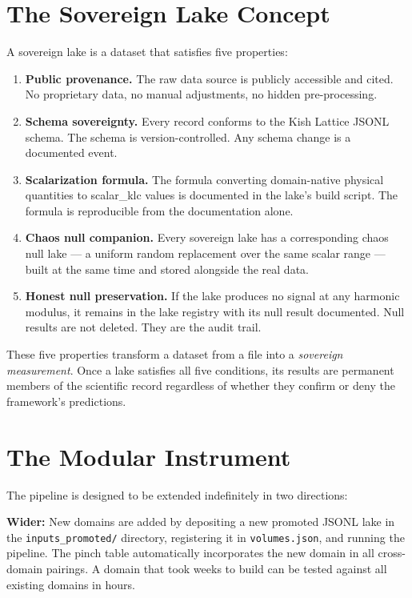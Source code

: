 \documentclass[11pt, letterpaper, openany]{book}
\begin{document}
\section*{The Sovereign Lake Concept}

A sovereign lake is a dataset that satisfies five properties:

\begin{enumerate}
\item \textbf{Public provenance.} The raw data source is publicly accessible and cited.
No proprietary data, no manual adjustments, no hidden pre-processing.

\item \textbf{Schema sovereignty.} Every record conforms to the Kish Lattice JSONL
schema. The schema is version-controlled. Any schema change is a documented event.

\item \textbf{Scalarization formula.} The formula converting domain-native physical
quantities to scalar\_klc values is documented in the lake's build script. The formula
is reproducible from the documentation alone.

\item \textbf{Chaos null companion.} Every sovereign lake has a corresponding chaos
null lake --- a uniform random replacement over the same scalar range --- built at the
same time and stored alongside the real data.

\item \textbf{Honest null preservation.} If the lake produces no signal at any harmonic
modulus, it remains in the lake registry with its null result documented. Null results
are not deleted. They are the audit trail.
\end{enumerate}

These five properties transform a dataset from a file into a \emph{sovereign measurement}.
Once a lake satisfies all five conditions, its results are permanent members of the
scientific record regardless of whether they confirm or deny the framework's predictions.

\section*{The Modular Instrument}

The pipeline is designed to be extended indefinitely in two directions:

\textbf{Wider:} New domains are added by depositing a new promoted JSONL lake in the
\texttt{inputs\_promoted/} directory, registering it in \texttt{volumes.json}, and
running the pipeline. The pinch table automatically incorporates the new domain in
all cross-domain pairings. A domain that took weeks to build can be tested against
all existing domains in hours.
\end{document}
